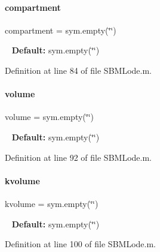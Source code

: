 \mbox{\label{class_s_b_m_lode_a70729d905c114f8f08b3507f20806dd2}} 
\paragraph{\texorpdfstring{compartment}{compartment}}
{\footnotesize\ttfamily compartment = sym.\+empty(\char`\"{}\char`\"{})}

~\newline
{\bfseries Default\+:} sym.\+empty(\char`\"{}\char`\"{}) 

Definition at line 84 of file S\+B\+M\+Lode.\+m.

\mbox{\label{class_s_b_m_lode_a9bc498ccac8db41438f855f5dd3f4c05}} 
\paragraph{\texorpdfstring{volume}{volume}}
{\footnotesize\ttfamily volume = sym.\+empty(\char`\"{}\char`\"{})}

~\newline
{\bfseries Default\+:} sym.\+empty(\char`\"{}\char`\"{}) 

Definition at line 92 of file S\+B\+M\+Lode.\+m.

\mbox{\label{class_s_b_m_lode_a9e15b899ae0b7804c80f96a342153934}} 
\paragraph{\texorpdfstring{kvolume}{kvolume}}
{\footnotesize\ttfamily kvolume = sym.\+empty(\char`\"{}\char`\"{})}

~\newline
{\bfseries Default\+:} sym.\+empty(\char`\"{}\char`\"{}) 

Definition at line 100 of file S\+B\+M\+Lode.\+m.

\mbox{\label{class_s_b_m_lode_a67d068407e71cba6ca16f3f6b6d1794c}} 
